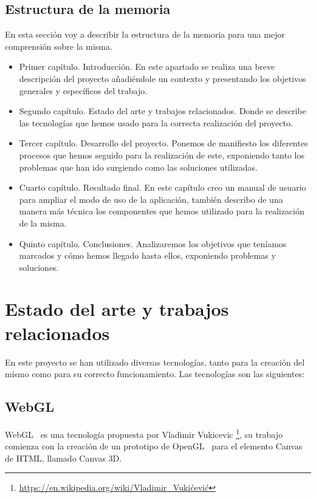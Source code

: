 \documentclass[a4paper, 12pt]{book}
\begin{document}
\section{Estructura de la memoria}
\label{sec:estructura}
En esta sección voy a describir la estructura de la memoria para una mejor 
comprensión sobre la misma.
\begin{itemize}
\item Primer capítulo. Introducción. En este apartado se realiza una breve descripción del proyecto añadiéndole un contexto y presentando los objetivos generales y específicos del trabajo.
\item Segundo capítulo. Estado del arte y trabajos relacionados. Donde se describe las tecnologías que hemos usado para la correcta realización del proyecto.
\item Tercer capítulo. Desarrollo del proyecto. Ponemos de manifiesto los diferentes procesos que hemos seguido para la realización de este, exponiendo tanto los problemas que han ido surgiendo como las soluciones utilizadas.
\item Cuarto capítulo. Resultado final. En este capítulo creo un manual de usuario para ampliar el modo de uso de la aplicación, también describo de una manera más técnica los componentes que hemos utilizado para la realización de la misma.
\item Quinto capítulo. Conclusiones. Analizaremos los objetivos que teníamos marcados y cómo hemos llegado hasta ellos, exponiendo problemas y soluciones.
\end{itemize}

\cleardoublepage %
\chapter{Estado del arte y trabajos relacionados} %
\label{chap:objetivos} %
En este proyecto se han utilizado diversas tecnologías, tanto para la creación del mismo como para su correcto funcionamiento. Las tecnologías son las siguientes:

\section{WebGL} %
\label{sec:WebGl}
WebGL~\cite{webGl} es una tecnología propuesta por Vladimir Vukicevic \footnote{\url{https://en.wikipedia.org/wiki/Vladimir_Vukićević}}, su trabajo comienza con la creación de un prototipo de OpenGL~\cite{openGL} para el elemento Canvas de HTML, llamado Canvas 3D.
\end{document}
